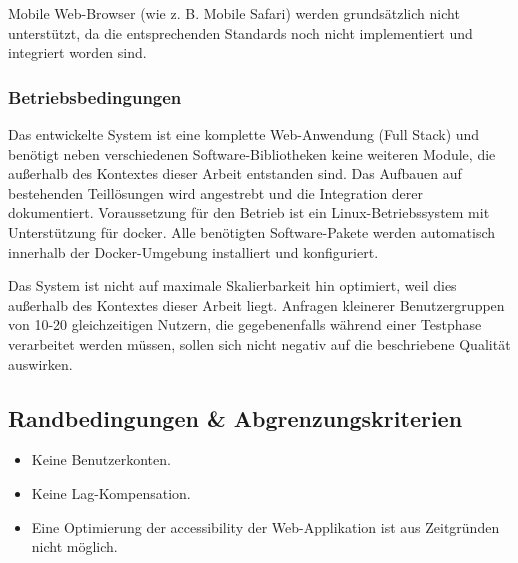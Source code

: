 Mobile Web-Browser (wie z. B. \glqq{}Mobile Safari\grqq{}) werden
grundsätzlich nicht unterstützt, da die entsprechenden Standards noch
nicht implementiert und integriert worden sind.

\subsubsection{Betriebsbedingungen}\label{betriebsbedingungen}

Das entwickelte System ist eine komplette Web-Anwendung (\glqq{}Full
Stack\grqq{}) und benötigt neben verschiedenen Software-Bibliotheken
keine weiteren Module, die außerhalb des Kontextes dieser Arbeit
entstanden
sind.
Das Aufbauen auf bestehenden Teillösungen wird angestrebt und die
Integration derer dokumentiert. Voraussetzung für den Betrieb ist ein
Linux-Betriebssystem mit Unterstützung für \gls{docker}. Alle benötigten
Software-Pakete werden automatisch innerhalb der Docker-Umgebung
installiert und konfiguriert.

Das System ist nicht auf maximale Skalierbarkeit hin optimiert, weil
dies außerhalb des Kontextes dieser Arbeit liegt. Anfragen kleinerer
Benutzergruppen von 10-20
gleichzeitigen
Nutzern, die gegebenenfalls während einer Testphase verarbeitet werden
müssen, sollen sich nicht negativ auf die beschriebene Qualität
auswirken.

\subsection{Randbedingungen \&
Abgrenzungskriterien}\label{randbedingungen-abgrenzungskriterien}

\begin{itemize}
\tightlist
\item
  Keine Benutzerkonten.
\item
  Keine Lag-Kompensation.
\item
  Eine Optimierung der \gls{accessibility} der Web-Applikation ist aus
  Zeitgründen nicht möglich.
\end{itemize}
